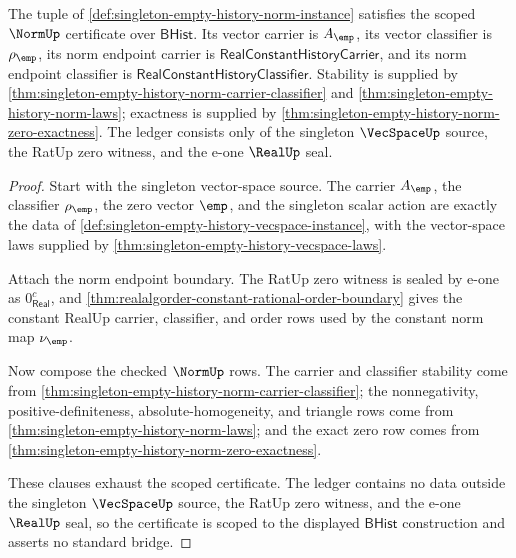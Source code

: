 \begin{theorem}
\label{thm:singleton-empty-history-norm-scoped-certificate}
The tuple of \autoref{def:singleton-empty-history-norm-instance} satisfies
the scoped $\NormUp$ certificate over $\mathsf{BHist}$. Its vector carrier is
$A_{\emp}$, its vector classifier is $\rho_{\emp}$, its norm endpoint carrier
is $\mathsf{RealConstantHistoryCarrier}$, and its norm endpoint classifier is
$\mathsf{RealConstantHistoryClassifier}$. Stability is supplied by
\autoref{thm:singleton-empty-history-norm-carrier-classifier} and
\autoref{thm:singleton-empty-history-norm-laws}; exactness is supplied by
\autoref{thm:singleton-empty-history-norm-zero-exactness}. The ledger consists
only of the singleton $\VecSpaceUp$ source, the RatUp zero witness, and the
e-one $\RealUp$ seal.
\end{theorem}
\begin{proof}
Start with the singleton vector-space source. The carrier $A_{\emp}$, the
classifier $\rho_{\emp}$, the zero vector $\emp$, and the singleton scalar
action are exactly the data of
\autoref{def:singleton-empty-history-vecspace-instance}, with the vector-space
laws supplied by \autoref{thm:singleton-empty-history-vecspace-laws}.

Attach the norm endpoint boundary. The RatUp zero witness is sealed by e-one
as $0_{\mathsf{Real}}^{c}$, and
\autoref{thm:realalgorder-constant-rational-order-boundary} gives the
constant RealUp carrier, classifier, and order rows used by the constant norm
map $\nu_{\emp}$.

Now compose the checked $\NormUp$ rows. The carrier and classifier stability
come from \autoref{thm:singleton-empty-history-norm-carrier-classifier}; the
nonnegativity, positive-definiteness, absolute-homogeneity, and triangle rows
come from \autoref{thm:singleton-empty-history-norm-laws}; and the exact
zero row comes from \autoref{thm:singleton-empty-history-norm-zero-exactness}.

These clauses exhaust the scoped certificate. The ledger contains no data
outside the singleton $\VecSpaceUp$ source, the RatUp zero witness, and the
e-one $\RealUp$ seal, so the certificate is scoped to the displayed
$\mathsf{BHist}$ construction and asserts no standard bridge.
\end{proof}

